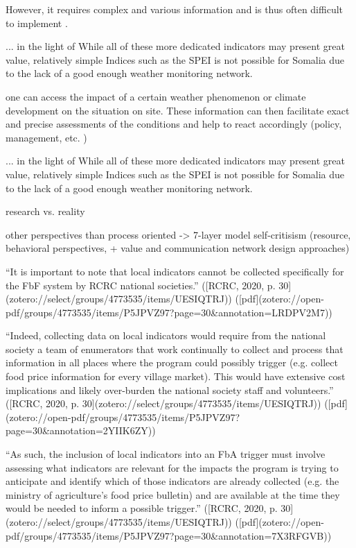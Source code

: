 However, it requires complex and various information and is thus often difficult to implement \autocite{liuWaterScarcityAssessments2017}.

... in the light of
While all of these more dedicated indicators may present great value, relatively simple Indices such as the SPEI is not possible for Somalia due to the lack of a good enough weather monitoring network. 

one can access the impact of a certain weather phenomenon or climate development on the situation on site. These information can then facilitate exact and precise assessments of the conditions and help to react accordingly (policy, management, etc. ) 


... in the light of
While all of these more dedicated indicators may present great value, relatively simple Indices such as the SPEI is not possible for Somalia due to the lack of a good enough weather monitoring network. 



research vs. reality

other perspectives than process oriented -> 7-layer model self-critisism (resource, behavioral perspectives, + value and communication network design approaches)

“It is important to note that local indicators cannot be collected specifically for the FbF system by RCRC national societies.” ([RCRC, 2020, p. 30](zotero://select/groups/4773535/items/UESIQTRJ)) ([pdf](zotero://open-pdf/groups/4773535/items/P5JPVZ97?page=30&annotation=LRDPV2M7))

“Indeed, collecting data on local indicators would require from the national society a team of enumerators that work continually to collect and process that information in all places where the program could possibly trigger (e.g. collect food price information for every village market). This would have extensive cost implications and likely over-burden the national society staff and volunteers.” ([RCRC, 2020, p. 30](zotero://select/groups/4773535/items/UESIQTRJ)) ([pdf](zotero://open-pdf/groups/4773535/items/P5JPVZ97?page=30&annotation=2YIIK6ZY))

“As such, the inclusion of local indicators into an FbA trigger must involve assessing what indicators are relevant for the impacts the program is trying to anticipate and identify which of those indicators are already collected (e.g. the ministry of agriculture's food price bulletin) and are available at the time they would be needed to inform a possible trigger.” ([RCRC, 2020, p. 30](zotero://select/groups/4773535/items/UESIQTRJ)) ([pdf](zotero://open-pdf/groups/4773535/items/P5JPVZ97?page=30&annotation=7X3RFGVB))

